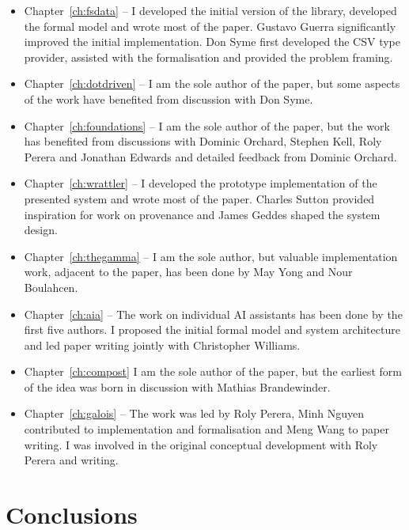 \documentclass[fleqn,11pt]{report}
\theoremstyle{definition}
\newenvironment{nitemize}
{ \vspace{-0.4em}
  \begin{itemize}
    \setlength{\itemsep}{5pt}
    \setlength{\parskip}{0pt}
    \setlength{\parsep}{0pt} }
{ \end{itemize}
  \vspace{-0.4em} }
\begin{document}
\begin{nitemize}
\item Chapter~\ref{ch:fsdata} \citep{petricek-2016-data} -- I developed the initial version
  of the library, developed the formal model and wrote most of the paper. Gustavo Guerra significantly
  improved the initial implementation. Don Syme first developed the CSV type provider, assisted with
  the formalisation and provided the problem framing.
\item Chapter~\ref{ch:dotdriven} \citep{petricek-2017-dot} -- I am the sole author of the paper,
  but some aspects of the work have benefited from discussion with Don Syme.
\item Chapter~\ref{ch:foundations} \citep{petricek-2020-live} -- I am the sole author of the paper,
  but the work has benefited from discussions with Dominic Orchard, Stephen Kell, Roly Perera and
  Jonathan Edwards and detailed feedback from Dominic Orchard.
\item Chapter~\ref{ch:wrattler} \citep{petricek-2018-notebooks} -- I developed the prototype
  implementation of the presented system and wrote most of the paper. Charles Sutton provided
  inspiration for work on provenance and James Geddes shaped the system design.
\item Chapter~\ref{ch:thegamma} \citep{petricek-2022-gamma} -- I am the sole author,
  but valuable implementation work, adjacent to the paper, has been done by May Yong and Nour Boulahcen.
\item Chapter~\ref{ch:aia} \citep{petricek-2023-aia} -- The work on individual AI assistants has
  been done by the first five authors. I proposed the initial formal model and system architecture
  and led paper writing jointly with Christopher Williams.
\item Chapter~\ref{ch:compost} \citep{petricek-2021-compost} I am the sole author of the paper,
  but the earliest form of the idea was born in discussion with Mathias Brandewinder.
\item Chapter~\ref{ch:galois} \citep{petricek-2022-galois} -- The work was led by Roly Perera,
  Minh Nguyen contributed to implementation and formalisation and Meng Wang to paper writing.
  I was involved in the original conceptual development with Roly Perera and writing.
\end{nitemize}


\chapter*{Conclusions}
\label{ch:concls}
\end{document}

